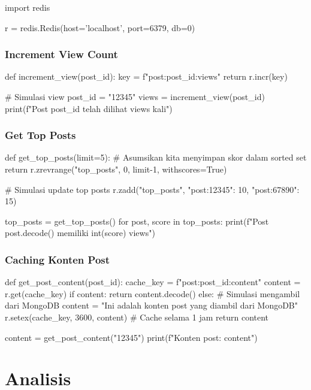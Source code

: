\begin{codebox}
import redis

r = redis.Redis(host='localhost', port=6379, db=0)
\end{codebox}

\subsubsection{Increment View Count}

\begin{codebox}
def increment_view(post_id):
    key = f"post:{post_id}:views"
    return r.incr(key)

# Simulasi view
post_id = "12345"
views = increment_view(post_id)
print(f"Post {post_id} telah dilihat {views} kali")
\end{codebox}

\subsubsection{Get Top Posts}

\begin{codebox}
def get_top_posts(limit=5):
    # Asumsikan kita menyimpan skor dalam sorted set
    return r.zrevrange("top_posts", 0, limit-1, withscores=True)

# Simulasi update top posts
r.zadd("top_posts", {"post:12345": 10, "post:67890": 15})

top_posts = get_top_posts()
for post, score in top_posts:
    print(f"Post {post.decode()} memiliki {int(score)} views")
\end{codebox}

\subsubsection{Caching Konten Post}

\begin{codebox}
def get_post_content(post_id):
    cache_key = f"post:{post_id}:content"
    content = r.get(cache_key)
    if content:
        return content.decode()
    else:
        # Simulasi mengambil dari MongoDB
        content = "Ini adalah konten post yang diambil dari MongoDB"
        r.setex(cache_key, 3600, content)  # Cache selama 1 jam
        return content

content = get_post_content("12345")
print(f"Konten post: {content}")
\end{codebox}

\section{Analisis}

